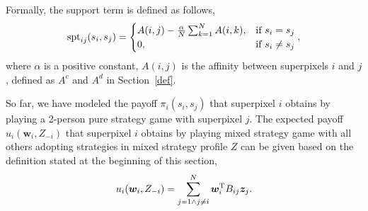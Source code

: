 \documentclass[journal]{IEEEtran}
\begin{document}
Formally, the support term is defined as follows,
\begin{equation}
\setlength{\abovedisplayskip}{2pt}
\setlength{\belowdisplayskip}{2pt}
\label{supp}
\mbox{spt}_{ij}(s_i, s_j) =
\begin{cases}
A(i, j) -  \frac{\alpha}{N} \sum_{k=1}^N A(i, k), & \mbox{if}~s_i = s_j \\
0, & \mbox{if}~s_i \ne s_j
\end{cases}, 
\end{equation}
where $\alpha$ is a positive constant, $A(i, j)$ is the affinity between superpixels $i$ and $j$, defined as $A^c$ and $A^d$ in Section~\ref{def}. 

So far, we have modeled the payoff $\pi_i(s_i, s_j)$ that superpixel $i$ obtains by playing a 2-person pure strategy game with superpixel $j$. The expected payoff $u_i(\boldsymbol{w}_i,Z_{-i})$ that superpixel $i$ obtains by playing mixed strategy game with all others adopting strategies in mixed strategy profile $Z$ can be given based on the definition stated at the beginning of this section, 
\begin{equation}
\setlength{\abovedisplayskip}{0.1pt}
\setlength{\belowdisplayskip}{0.1pt}
u_i(\boldsymbol{w}_i,Z_{-i}) = \sum_{j=1 \land j \ne i}^N \boldsymbol{w}_i^{\rm T} B_{ij} \boldsymbol{z}_j. 
\end{equation}
\end{document}
